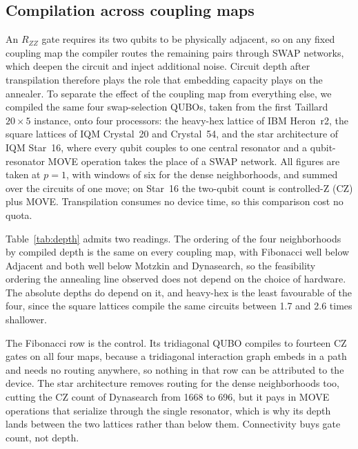 \documentclass{svproc}
\newcommand{\rev}[1]{{\color{blue}#1}}
\newcommand{\rev}[1]{#1}
\begin{document}
\subsection{Compilation across coupling maps}
\label{subsec:depth}
An $R_{ZZ}$ gate requires its two qubits to be physically adjacent, so on any
fixed coupling map the compiler routes the remaining pairs through SWAP
networks, which deepen the circuit and inject additional noise. Circuit depth
after transpilation therefore plays the role that embedding capacity plays on
the annealer. To separate the effect of the coupling map from everything else,
we compiled the same four swap-selection QUBOs, taken from the first Taillard
$20\times5$ instance, onto four processors: the heavy-hex lattice of IBM
Heron~r2, the square lattices of IQM Crystal~20 and Crystal~54, and the star
architecture of IQM Star~16, where every qubit couples to one central
resonator and a \rev{qubit-resonator} MOVE operation takes the place of a SWAP network. All
figures are taken at $p=1$, with windows of six for the dense neighborhoods,
and summed over the circuits of one move; on Star~16 the two-qubit count is \rev{controlled-Z (CZ)}
plus MOVE. Transpilation consumes no device time, so this comparison cost no quota.

Table~\ref{tab:depth} admits two readings. The ordering of the four
neighborhoods by compiled depth is the same on every coupling map, with
Fibonacci well below Adjacent and both well below Motzkin and Dynasearch, so
the feasibility ordering the annealing line observed does not depend on the
choice of hardware. The absolute depths do depend on it, and heavy-hex is the
least favourable of the four, since the square lattices compile the same
circuits between 1.7 and 2.6 times shallower.

The Fibonacci row is the control. Its tridiagonal QUBO compiles to fourteen CZ
gates on all four maps, because a tridiagonal interaction graph embeds in a
path and needs no routing anywhere, so nothing in that row can be attributed
to the device. The star architecture removes routing for the dense
neighborhoods too, cutting the CZ count of Dynasearch from 1668 to 696, but it
pays in MOVE operations that serialize through the single resonator, which is
why its depth lands between the two lattices rather than below them.
Connectivity buys gate count, not depth.
\end{document}
